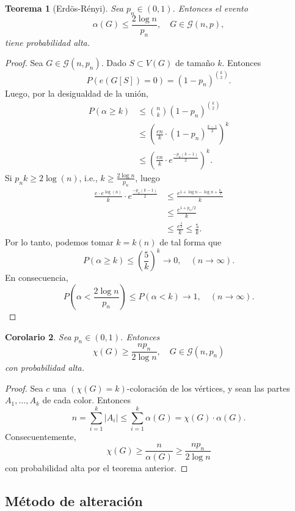 \documentclass[12pt]{report}
\theoremstyle{plain}
\newtheorem{theorem}{Teorema}[section]
\newtheorem{corollary}[theorem]{Corolario}
\theoremstyle{definition}
\newcommand{\abs}[1]{\left \vert #1 \right \vert}
\begin{document}
\begin{theorem}[Erdös-Rényi]
Sea $p_n \in (0,1)$. Entonces el evento
\[
    \alpha (G) \leq \frac{2 \log n}{p_n}, \quad G \in \mathcal G(n,p),
\]
tiene probabilidad alta.
\end{theorem}
\begin{proof}
Sea $G \in \mathcal G (n,p_n)$. Dado $S \subset V(G)$ de tamaño $k$. Entonces
\[
    P(e(G[S]) = 0) = (1-p_n)^{\binom k 2}.
\]
Luego, por la desigualdad de la unión,
\begin{align*}
P(\alpha \geq k) &\leq \binom n k (1-p_n)^{\binom k 2} \\
&\leq \left ( \frac {en}{k} \cdot (1-p_n)^{\frac{k-1}2} \right )^k \\
&\leq \left ( \frac {en}k \cdot e^{\frac{-p_n(k-1)}{2}} \right )^k.
\end{align*}
Si $p_nk \geq 2 \log (n)$, i.e., $k \geq \frac{2 \log n }{p_n}$, luego
\begin{align*}
\frac{e \cdot e^{\log (n)}}{k} \cdot e^{\frac{-p_n (k-1)}{2}} &\leq \frac{e^{1 + \log n - \log n + \frac {p_n} 2}}{k} \\
&\leq \frac{e^{1 + p_n/2}}{k} \\
&\leq \frac {e^{\frac 3 2}}{k} \leq \frac 5 k.
\end{align*}
Por lo tanto, podemos tomar $k=k(n)$ de tal forma que
\[
    P(\alpha \geq k) \leq \left ( \frac 5 k \right )^k \longrightarrow 0, \quad (n \to \infty).
\]
En consecuencia,
\[
    P \left (\alpha < \frac{2 \log n}{p_n} \right ) \leq P(\alpha < k) \longrightarrow 1, \quad (n \to \infty).
\]
\end{proof}


\begin{corollary}
Sea $p_n \in (0,1)$. Entonces
\[
    \chi (G) \geq \frac{n p_n}{2 \log n} , \quad G \in \mathcal G (n,p_n)
\]
con probabilidad alta.
\end{corollary}
\begin{proof}
Sea $c$ una $(\chi (G) = k)$-coloración de los vértices, y sean las partes $A_1, \ldots, A_k$ de cada color. Entonces
\[
    n = \sum_{i = 1}^k \abs{A_i} \leq \sum_{i = 1}^k \alpha (G) = \chi (G) \cdot \alpha (G).
\]
Consecuentemente,
\[
    \chi (G) \geq \frac{n}{\alpha (G)} \geq \frac{n p_n}{2 \log n}
\]
con probabilidad alta por el teorema anterior.
\end{proof}


\subsection{Método de alteración}
\end{document}
